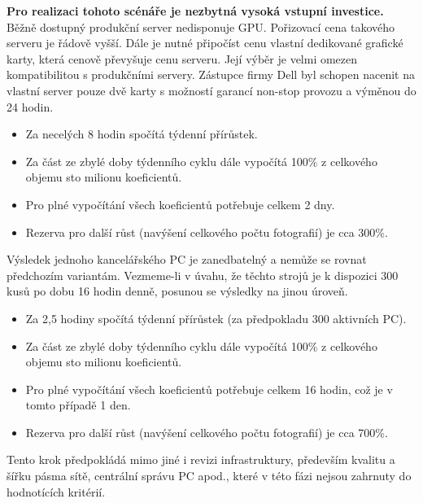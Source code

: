 \textbf{Pro realizaci tohoto scénáře je nezbytná vysoká vstupní investice.} Běžně dostupný produkční server nedisponuje GPU. Pořizovací cena takového serveru je řádově vyšší. Dále je nutné připočíst cenu vlastní dedikované grafické karty, která cenově převyšuje cenu serveru. Její výběr je velmi omezen kompatibilitou s produkčními servery. Zástupce firmy Dell byl schopen nacenit na vlastní server pouze dvě karty s možností garancí non-stop provozu a výměnou do 24 hodin.

\begin{itemize}
	\setlength{\parskip}{0pt}
	\setlength{\itemsep}{0pt}
	\item {Za necelých 8 hodin spočítá týdenní přírůstek.}
	\item {Za část ze zbylé doby týdenního cyklu dále vypočítá 100\% z celkového objemu sto milionu koeficientů.}
	\item {Pro plné vypočítání všech koeficientů potřebuje celkem 2 dny.}
	\item {Rezerva pro další růst (navýšení celkového počtu fotografií) je cca 300\%.}
\end{itemize}

Výsledek jednoho kancelářského PC je zanedbatelný a nemůže se rovnat předchozím variantám. Vezmeme-li v úvahu, že těchto strojů je k dispozici 300 kusů po dobu 16 hodin denně, posunou se výsledky na jinou úroveň.

\begin{itemize}
	\setlength{\parskip}{0pt}
	\setlength{\itemsep}{0pt}
	\item {Za 2,5 hodiny spočítá týdenní přírůstek (za předpokladu 300 aktivních PC).}
	\item {Za část ze zbylé doby týdenního cyklu dále vypočítá 100\% z celkového objemu sto milionu koeficientů.}
	\item {Pro plné vypočítání všech koeficientů potřebuje celkem 16 hodin, což je v tomto případě 1 den.}
	\item {Rezerva pro další růst (navýšení celkového počtu fotografií) je cca 700\%.}
\end{itemize}

Tento krok předpokládá mimo jiné i revizi infrastruktury, především kvalitu a šířku pásma sítě, centrální správu PC apod., které v této fázi nejsou zahrnuty do hodnotících kritérií.

